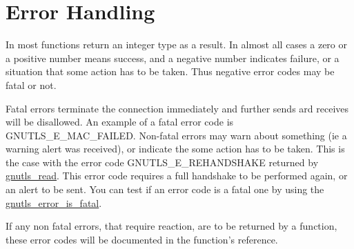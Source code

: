 \section{Error Handling}
\par
In \gnutls most functions return an integer type as a result.
In almost all cases a zero or a positive number means success, and
a negative number indicates failure, or a situation that some
action has to be taken. Thus negative error codes may be fatal
or not. 
\par 
Fatal errors terminate the connection immediately and
further sends ard receives will be disallowed. An example of
a fatal error code is GNUTLS\_E\_MAC\_FAILED. Non-fatal errors
may warn about something (ie a warning alert was received), or
indicate the some action has to be taken. This is the case with
the error code GNUTLS\_E\_REHANDSHAKE returned by 
\hyperref{gnutls\_read()}{gnutls\_read() (see Section }{)}{gnutls_read}.
This error code requires a full handshake to be performed again, or an alert to be sent.
You can test if an error code is a fatal one by using the
\hyperref{gnutls\_error\_is\_fatal()}{gnutls\_error\_is\_fatal() (see Section }{)}{gnutls_error_is_fatal}.
\par
If any non fatal errors, that require reaction, are to be returned by a
function, these error codes will be documented
in the function's reference.

